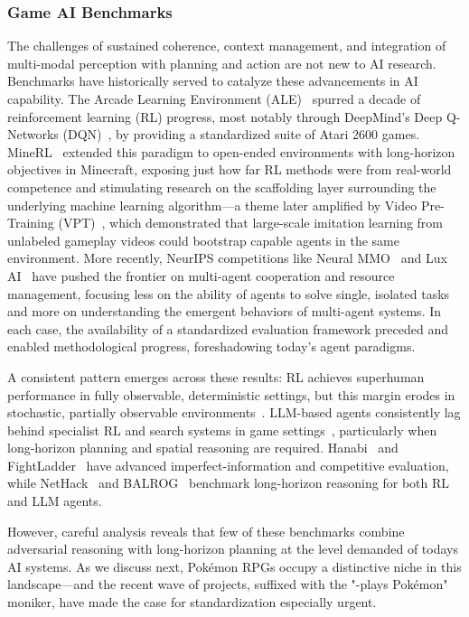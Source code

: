 \subsubsection{Game AI Benchmarks}\label{sec:game_benchmarks}

The challenges  of sustained coherence, context management, and integration of multi-modal perception with planning and action are not new to AI research.  Benchmarks have historically served to catalyze these advancements in AI capability. The Arcade Learning Environment (ALE)~\citep{bellemare2013arcade} spurred a decade of reinforcement learning (RL) progress, most notably through DeepMind's Deep Q-Networks (DQN)~\citep{mnih2015human}, by providing a standardized suite of Atari 2600 games. MineRL~\citep{guss2019minerl} extended this paradigm to open-ended environments with long-horizon objectives in Minecraft, exposing just how far RL methods were from real-world competence and stimulating research on the scaffolding layer surrounding the underlying machine learning algorithm---a theme later amplified by Video Pre-Training (VPT)~\citep{baker2022video}, which demonstrated that large-scale imitation learning from unlabeled gameplay videos could bootstrap capable agents in the same environment. More recently, NeurIPS competitions like Neural MMO~\citep{liu2023neurips, suarez2023neural} and Lux AI~\citep{tao2024lux} have pushed the frontier on multi-agent cooperation and resource management, focusing less on the ability of agents to solve single, isolated tasks and more on understanding the emergent behaviors of multi-agent systems. In each case, the availability of a standardized evaluation framework preceded and enabled methodological progress, foreshadowing today's agent paradigms.

A consistent pattern emerges across these results: RL achieves superhuman performance in fully observable, deterministic settings, but this margin erodes in stochastic, partially observable environments~\citep{samuel1959}. LLM-based agents consistently lag behind specialist RL and search systems in game settings~\citep{kaggle2025gamearena, paglieri2024balrog}, particularly when long-horizon planning and spatial reasoning are required. Hanabi~\citep{bard2020hanabi} and FightLadder~\citep{li2024fightladder} have advanced imperfect-information and competitive evaluation, while NetHack~\citep{kuttler2020nethack} and BALROG~\citep{paglieri2024balrog} benchmark long-horizon reasoning for both RL and LLM agents.

However, careful analysis reveals that few of these benchmarks combine adversarial reasoning with long-horizon planning at the level demanded of todays AI systems. As we discuss next, Pok\'{e}mon RPGs occupy a distinctive niche in this landscape---and the recent wave of projects, suffixed with the "-plays Pok\'{e}mon" moniker, have made the case for standardization especially urgent.

